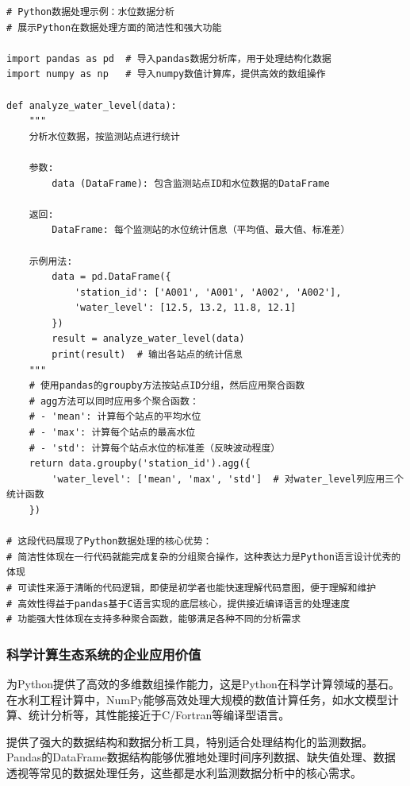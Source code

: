 \begin{lstlisting}[style=python]
# Python数据处理示例：水位数据分析
# 展示Python在数据处理方面的简洁性和强大功能

import pandas as pd  # 导入pandas数据分析库，用于处理结构化数据
import numpy as np   # 导入numpy数值计算库，提供高效的数组操作

def analyze_water_level(data):
    """
    分析水位数据，按监测站点进行统计
    
    参数:
        data (DataFrame): 包含监测站点ID和水位数据的DataFrame
        
    返回:
        DataFrame: 每个监测站的水位统计信息（平均值、最大值、标准差）
        
    示例用法:
        data = pd.DataFrame({
            'station_id': ['A001', 'A001', 'A002', 'A002'],
            'water_level': [12.5, 13.2, 11.8, 12.1]
        })
        result = analyze_water_level(data)
        print(result)  # 输出各站点的统计信息
    """
    # 使用pandas的groupby方法按站点ID分组，然后应用聚合函数
    # agg方法可以同时应用多个聚合函数：
    # - 'mean': 计算每个站点的平均水位
    # - 'max': 计算每个站点的最高水位  
    # - 'std': 计算每个站点水位的标准差（反映波动程度）
    return data.groupby('station_id').agg({
        'water_level': ['mean', 'max', 'std']  # 对water_level列应用三个统计函数
    })
    
# 这段代码展现了Python数据处理的核心优势：
# 简洁性体现在一行代码就能完成复杂的分组聚合操作，这种表达力是Python语言设计优秀的体现
# 可读性来源于清晰的代码逻辑，即使是初学者也能快速理解代码意图，便于理解和维护
# 高效性得益于pandas基于C语言实现的底层核心，提供接近编译语言的处理速度
# 功能强大性体现在支持多种聚合函数，能够满足各种不同的分析需求
\end{lstlisting}

\hypertarget{ux79d1ux5b66ux8ba1ux7b97ux751fux6001ux7cfbux7edfux7684ux4f01ux4e1aux5e94ux7528ux4ef7ux503c}{%
\subsubsection{科学计算生态系统的企业应用价值}\label{ux79d1ux5b66ux8ba1ux7b97ux751fux6001ux7cfbux7edfux7684ux4f01ux4e1aux5e94ux7528ux4ef7ux503c}}

为Python提供了高效的多维数组操作能力，这是Python在科学计算领域的基石。在水利工程计算中，NumPy能够高效处理大规模的数值计算任务，如水文模型计算、统计分析等，其性能接近于C/Fortran等编译型语言。

提供了强大的数据结构和数据分析工具，特别适合处理结构化的监测数据。Pandas的DataFrame数据结构能够优雅地处理时间序列数据、缺失值处理、数据透视等常见的数据处理任务，这些都是水利监测数据分析中的核心需求。

